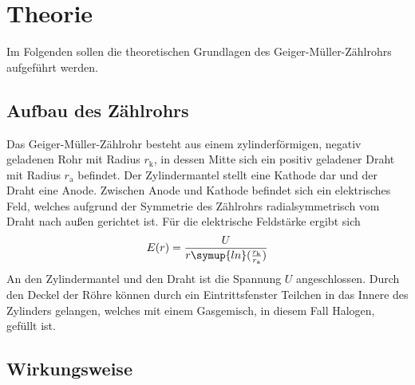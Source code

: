 \section{Theorie} \label{sec:Theorie}

Im Folgenden sollen die theoretischen Grundlagen des Geiger-Müller-Zählrohrs aufgeführt werden.

\subsection{Aufbau des Zählrohrs}

    Das Geiger-Müller-Zählrohr besteht aus einem zylinderförmigen, negativ geladenen Rohr mit 
    Radius $r_\text{k}$, in dessen Mitte sich ein positiv geladener Draht 
    mit Radius $r_\text{a}$ befindet.
    Der Zylindermantel stellt eine Kathode dar und der Draht eine Anode.
    Zwischen Anode und Kathode befindet sich ein elektrisches Feld, welches aufgrund
    der Symmetrie des Zählrohrs radialsymmetrisch vom Draht nach außen gerichtet ist.
    Für die elektrische Feldstärke ergibt sich
    \begin{equation}
        E(r) = \frac{U}{r \symup{ln}(\frac{r_\text{k}}{r_\text{a}})}
    \end{equation}
    An den Zylindermantel und den Draht ist die Spannung $U$ angeschlossen.
    Durch den Deckel der Röhre können durch ein Eintrittsfenster Teilchen in das Innere des Zylinders 
    gelangen, welches mit einem Gasgemisch, in diesem Fall Halogen, gefüllt ist.

\subsection{Wirkungsweise}

